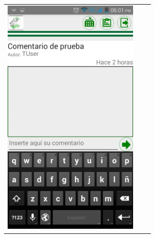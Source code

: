 \begin{tabular}{p{7cm}p{8mm}p{7cm}}
\\
\includegraphics[width=6.5cm]{./android/imagenes/com3.png}



\\
\end{tabular}
%
%
%
%
%
%

